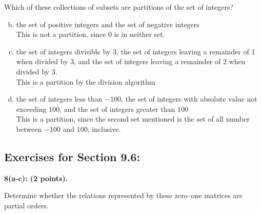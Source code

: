 \documentclass[12pt]{article}  %
\begin{document}
\noindent
Which of these collections of subsets are partitions of the set of integers?
\begin{enumerate}[a)]
    \setcounter{enumi}{1}
    \item the set of positive integers and the set of negative integers\\
    This is not a partition, since $0$ is in neither set.
    
    \item the set of integers divisible by 3, the set of integers leaving a remainder of 1 when divided by 3, and the set of integers leaving a remainder of 2 when divided by 3.\\
    This is a partition by the division algorithm
    
    \item the set of integers less than $-100$, the set of integers with absolute value not exceeding $100$, and the set of integers greater than $100$\\
    This is a partition, since the second set mentioned is the set of all number between $-100$ and $100$, inclusive.
\end{enumerate}

\clearpage
\subsection*{Exercises for Section 9.6:}     

\noindent
{\bf 8(a-c): (2 points).}

\noindent
Determine whether the relations represented by these
zero–one matrices are partial orders.
\end{document}
